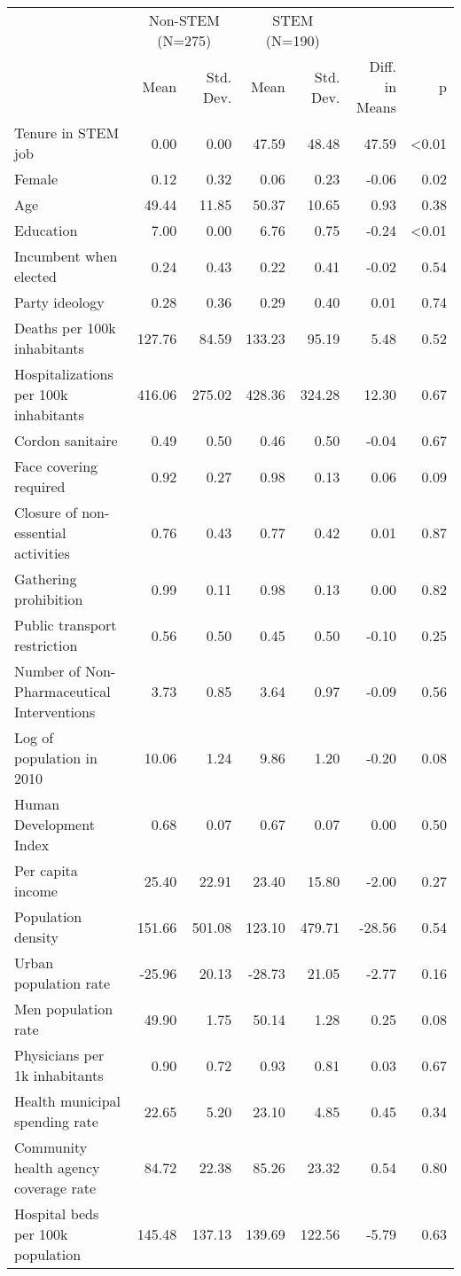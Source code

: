 \begin{table}
\centering
\begin{tabular}[t]{lrrrrrr}
\toprule
\multicolumn{1}{c}{ } & \multicolumn{2}{c}{Non-STEM (N=275)} & \multicolumn{2}{c}{STEM (N=190)} & \multicolumn{2}{c}{ } \\
\cmidrule(l{3pt}r{3pt}){2-3} \cmidrule(l{3pt}r{3pt}){4-5}
  & Mean & Std. Dev. & Mean & Std. Dev. & Diff. in Means & p\\
\midrule
Tenure in STEM job & 0.00 & 0.00 & 47.59 & 48.48 & 47.59 & <0.01\\
Female & 0.12 & 0.32 & 0.06 & 0.23 & -0.06 & 0.02\\
Age & 49.44 & 11.85 & 50.37 & 10.65 & 0.93 & 0.38\\
Education & 7.00 & 0.00 & 6.76 & 0.75 & -0.24 & <0.01\\
Incumbent when elected & 0.24 & 0.43 & 0.22 & 0.41 & -0.02 & 0.54\\
Party ideology & 0.28 & 0.36 & 0.29 & 0.40 & 0.01 & 0.74\\
Deaths per 100k inhabitants & 127.76 & 84.59 & 133.23 & 95.19 & 5.48 & 0.52\\
Hospitalizations per 100k inhabitants & 416.06 & 275.02 & 428.36 & 324.28 & 12.30 & 0.67\\
Cordon sanitaire & 0.49 & 0.50 & 0.46 & 0.50 & -0.04 & 0.67\\
Face covering required & 0.92 & 0.27 & 0.98 & 0.13 & 0.06 & 0.09\\
Closure of non-essential activities & 0.76 & 0.43 & 0.77 & 0.42 & 0.01 & 0.87\\
Gathering prohibition & 0.99 & 0.11 & 0.98 & 0.13 & 0.00 & 0.82\\
Public transport restriction & 0.56 & 0.50 & 0.45 & 0.50 & -0.10 & 0.25\\
Number of Non-Pharmaceutical Interventions & 3.73 & 0.85 & 3.64 & 0.97 & -0.09 & 0.56\\
Log of population in 2010 & 10.06 & 1.24 & 9.86 & 1.20 & -0.20 & 0.08\\
Human Development Index & 0.68 & 0.07 & 0.67 & 0.07 & 0.00 & 0.50\\
Per capita income & 25.40 & 22.91 & 23.40 & 15.80 & -2.00 & 0.27\\
Population density & 151.66 & 501.08 & 123.10 & 479.71 & -28.56 & 0.54\\
Urban population rate & -25.96 & 20.13 & -28.73 & 21.05 & -2.77 & 0.16\\
Men population rate & 49.90 & 1.75 & 50.14 & 1.28 & 0.25 & 0.08\\
Physicians per 1k inhabitants & 0.90 & 0.72 & 0.93 & 0.81 & 0.03 & 0.67\\
Health municipal spending rate & 22.65 & 5.20 & 23.10 & 4.85 & 0.45 & 0.34\\
Community health agency coverage rate & 84.72 & 22.38 & 85.26 & 23.32 & 0.54 & 0.80\\
Hospital beds per 100k population & 145.48 & 137.13 & 139.69 & 122.56 & -5.79 & 0.63\\
\bottomrule
\end{tabular}
\end{table}
